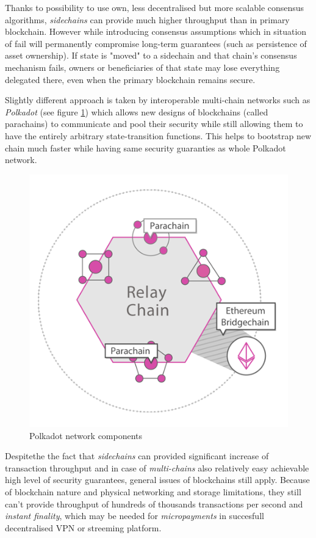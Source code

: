 \documentclass[a4paper,12pt]{article}
\begin{document}
Thanks to possibility to use own, less decentralised but more scalable consensus
algorithms, \textit{sidechains} can provide much higher throughput than in 
primary blockchain. However while introducing consensus assumptions which in 
situation of fail will permanently compromise long-term guarantees (such as 
persistence of asset ownership). If state is "moved" to a sidechain and that 
chain's consensus mechanism fails, owners or beneficiaries of that state may 
lose everything delegated there, even when the primary blockchain remains
secure.

Slightly different approach is taken by interoperable multi-chain networks such 
as \textit{Polkadot} (see figure \ref{img:polkadot}) which allows new designs of
blockchains (called parachains) to communicate and pool their security while 
still allowing them to have the entirely arbitrary state-transition functions. 
This helps to bootstrap new chain much faster while having same security 
guaranties as whole Polkadot network.

\begin{figure}[H]
    \centering
    \includegraphics[scale=0.5]{../img/polkadot}
    \caption{Polkadot network components}
    \label{img:polkadot}
\end{figure}

Despitethe the fact that \textit{sidechains} can provided significant increase 
of transaction throughput and in case of \textit{multi-chains} also relatively
easy achievable high level of security guarantees, general issues of blockchains
still apply. Because of blockchain nature and physical networking and storage 
limitations, they still can't provide throughput of hundreds of thousands 
transactions per second and \textit{instant finality}, which may be needed for 
\textit{micropayments} in succesfull decentralised VPN or streeming platform.
\end{document}
